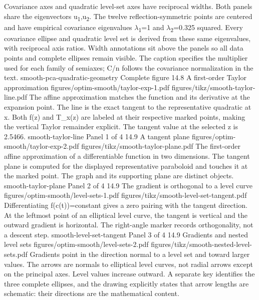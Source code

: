 {Covariance axes and quadratic level-set axes have reciprocal widths.}
{Both panels share the eigenvectors u\textsubscript{1},u\textsubscript{2}. The twelve reflection-symmetric points are centered and have empirical covariance eigenvalues \ensuremath{\lambda}\textsubscript{1}=1 and \ensuremath{\lambda}\textsubscript{2}=0.325 squared. Every covariance ellipse and quadratic level set is derived from these same eigenvalues, with reciprocal axis ratios. Width annotations sit above the panels so all data points and complete ellipses remain visible. The caption specifies the multiplier used for each family of semiaxes; C/n follows the covariance normalization in the text.}
{smooth-pca-quadratic-geometry}
{Complete figure}
{14.8}
{A first-order Taylor approximation}
{figures/optim-smooth/taylor-exp-1.pdf}
{figures/tikz/smooth-taylor-line.pdf}
{The affine approximation matches the function and its derivative at the expansion point.}
{The line is the exact tangent to the representative quadratic at x. Both f(z) and T\_x(z) are labeled at their respective marked points, making the vertical Taylor remainder explicit. The tangent value at the selected z is 2.5466.}
{smooth-taylor-line}
{Panel 1 of 4}
{14.9}
{A tangent plane}
{figures/optim-smooth/taylor-exp-2.pdf}
{figures/tikz/smooth-taylor-plane.pdf}
{The first-order affine approximation of a differentiable function in two dimensions.}
{The tangent plane is computed for the displayed representative paraboloid and touches it at the marked point. The graph and its supporting plane are distinct objects.}
{smooth-taylor-plane}
{Panel 2 of 4}
{14.9}
{The gradient is orthogonal to a level curve}
{figures/optim-smooth/level-sets-1.pdf}
{figures/tikz/smooth-level-set-tangent.pdf}
{Differentiating f(c(t))=constant gives a zero pairing with the tangent direction.}
{At the leftmost point of an elliptical level curve, the tangent is vertical and the outward gradient is horizontal. The right-angle marker records orthogonality, not a descent step.}
{smooth-level-set-tangent}
{Panel 3 of 4}
{14.9}
{Gradients and nested level sets}
{figures/optim-smooth/level-sets-2.pdf}
{figures/tikz/smooth-nested-level-sets.pdf}
{Gradients point in the direction normal to a level set and toward larger values.}
{The arrows are normals to elliptical level curves, not radial arrows except on the principal axes. Level values increase outward. A separate key identifies the three complete ellipses, and the drawing explicitly states that arrow lengths are schematic: their directions are the mathematical content.}
